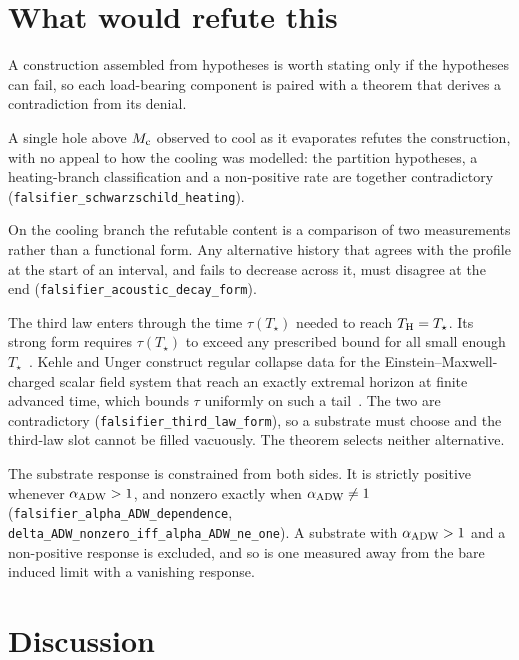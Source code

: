 \documentclass[aps,prl,reprint,nofootinbib,superscriptaddress]{revtex4-2}
\newcommand{\Thawk}{T_{\rm H}}
\newcommand{\Mc}{M_{\rm c}}
\newcommand{\aADW}{\alpha_{\rm ADW}}
\begin{document}
\section{What would refute this}
\label{sec:falsifiers}

A construction assembled from hypotheses is worth stating only if the
hypotheses can fail, so each load-bearing component is paired with a
theorem that derives a contradiction from its denial.

A single hole above $\Mc$ observed to cool as it evaporates refutes the
construction, with no appeal to how the cooling was modelled: the partition
hypotheses, a heating-branch classification and a non-positive rate are
together contradictory (\texttt{falsifier\_schwarzschild\_heating}).

On the cooling branch the refutable content is a comparison of two
measurements rather than a functional form. Any alternative history that
agrees with the profile at the start of an interval, and fails to decrease
across it, must disagree at the end
(\texttt{falsifier\_acoustic\_decay\_form}).

The third law enters through the time $\tau(T_\star)$ needed to reach
$\Thawk = T_\star$. Its strong form requires $\tau(T_\star)$ to exceed any
prescribed bound for all small enough $T_\star$~\cite{Israel1986}. Kehle
and Unger construct regular collapse data for the Einstein--Maxwell-charged
scalar field system that reach an exactly extremal horizon at finite
advanced time, which bounds $\tau$ uniformly on such a
tail~\cite{KehleUnger2022ThirdLaw}. The two are contradictory
(\texttt{falsifier\_third\_law\_form}), so a substrate must choose and the
third-law slot cannot be filled vacuously. The theorem selects neither
alternative.

The substrate response is constrained from both sides. It is strictly
positive whenever $\aADW > 1$, and nonzero exactly when $\aADW \neq 1$
(\texttt{falsifier\_alpha\_ADW\_dependence},
\texttt{delta\_ADW\_nonzero\_iff\_alpha\_ADW\_ne\_one}). A substrate with
$\aADW > 1$ and a non-positive response is excluded, and so is one measured
away from the bare induced limit with a vanishing response.

\section{Discussion}
\label{sec:discussion}
\end{document}
